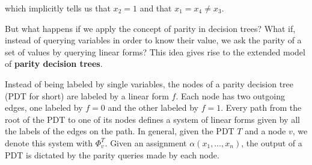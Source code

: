 which implicitly tells us that $x_2 = 1$ and that $x_1 = x_4 \neq x_3$. 

\newpage

But what happens if we apply the concept of parity in decision trees? What if, instead of querying variables in order to know their value, we ask the parity of a set of values by querying linear forms? This idea gives rise to the extended model of \textbf{parity decision trees}.

Instead of being labeled by single variables, the nodes of a parity decision tree (PDT for short) are labeled by a linear form $f$. Each node has two outgoing edges, one labeled by $f = 0$ and the other labeled by $f = 1$. Every path from the root of the PDT to one of its nodes defines a system of linear forms given by all the labels of the edges on the path. In general, given the PDT $T$ and a node $v$, we denote this system with $\Phi_v^T$. Given an assignment $\alpha(x_1, \ldots, x_n)$, the output of a PDT is dictated by the parity queries made by each node.

